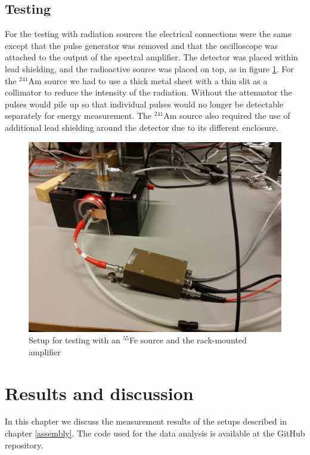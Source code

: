\documentclass[a4paper]{article}
\begin{document}
\subsection{Testing}
\label{setup_testing}
For the testing with radiation sources the electrical connections were the same except that the pulse generator was removed and that the oscilloscope was attached to the output of the spectral amplifier.
The detector was placed within lead shielding, and the radioactive source was placed on top, as in figure \ref{fig:setup_testing}.
For the $^{241}$Am source we had to use a thick metal sheet with a thin slit as a collimator to reduce the intensity of the radiation.
Without the attenuator the pulses would pile up so that individual pulses would no longer be detectable separately for energy measurement.
The $^{241}$Am source also required the use of additional lead shielding around the detector due to its different enclosure.

\begin{figure}[ht!]
\centering
\includegraphics[width=\textwidth]{fig/IMG_20201130_144418.jpg}
\caption{Setup for testing with an $^{55}$Fe source and the rack-mounted amplifier}
\label{fig:setup_testing}
\end{figure}


\clearpage
\section{Results and discussion}
\label{results}
In this chapter we discuss the measurement results of the setups described in chapter \ref{assembly}.
The code used for the data analysis is available at the GitHub repository. \cite{repo}
\end{document}
